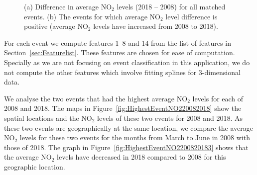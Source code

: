\documentclass[a4paper,11pt]{article}
\begin{document}
\begin{figure}[!htb]
  \centering
  \caption{(a) Difference in average $\text{NO}_2$ levels (2018 -- 2008) for all matched events. (b) The events for which average $\text{NO}_2$ level difference is positive (average $\text{NO}_2$ levels have increased from 2008 to 2018).}
  \label{fig:DifferenceInNO2Levels}
\end{figure}

For each event we compute features 1--8 and 14 from the list of features in Section~\ref{sec:Featurelist}. These features are chosen for ease of computation. Specially as we are not focusing on event classification in this application, we do not compute the other features which involve fitting splines for 3-dimensional data.

We analyse the two events that had the highest average $\text{NO}_2$ levels for each of 2008 and 2018. The maps in Figure~\ref{fig:HighestEventNO220082018} show the spatial locations and the $\text{NO}_2$ levels of these two events for 2008 and 2018. As these two events are geographically at the same location, we compare the average  $\text{NO}_2$ levels for these two events for the months from March to June in 2008 with those of 2018. The graph in Figure~\ref{fig:HighestEventNO2200820183} shows that the average $\text{NO}_2$ levels have decreased in 2018 compared to 2008 for this geographic location.
\end{document}

